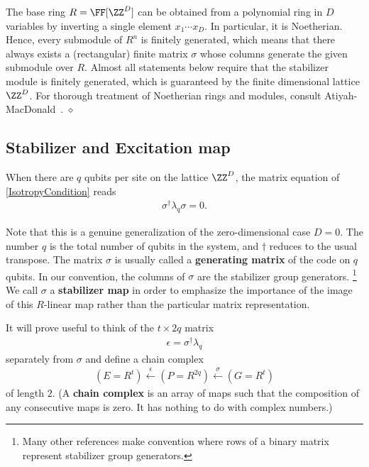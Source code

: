 \begin{rem}
The base ring $R = \FF[\ZZ^D]$ can be obtained from a polynomial ring in $D$ variables
by inverting a single element $x_1 \cdots x_D$.
In particular, it is Noetherian.
Hence, every submodule of $R^n$ is finitely generated,
which means that there always exists a (rectangular) finite matrix $\sigma$
whose columns generate the given submodule over $R$.
Almost all statements below require that the stabilizer module
is finitely generated,
which is guaranteed by the finite dimensional lattice $\ZZ^D$.
For thorough treatment of Noetherian rings and modules,
consult Atiyah-MacDonald~\cite{AtiyahMacDonald}.
\hfill $\diamond$ \end{rem}



\subsection{Stabilizer and Excitation map}

When there are $q$ qubits per site on the lattice $\ZZ^D$,
the matrix equation of \ref{IsotropyCondition} reads
\begin{align}
\sigma^\dagger \lambda_q \sigma = 0.
\end{align}

Note that this is a genuine generalization of the zero-dimensional case $D=0$.
The number $q$ is the total number of qubits in the system,
and $\dagger$ reduces to the usual transpose.
The matrix $\sigma$ is usually called a {\bf generating matrix} of the code on $q$ qubits.
In our convention, the columns of $\sigma$ are the stabilizer group generators.%
\footnote{
Many other references make convention where rows of a binary matrix represent
stabilizer group generators.
}
We call $\sigma$ a {\bf stabilizer map}
in order to emphasize the importance of the image of this $R$-linear map 
rather than the particular matrix representation.


It will prove useful to think of the $t \times 2q$ matrix 
\begin{align}
\epsilon = \sigma^\dagger \lambda_q
\end{align}
separately from $\sigma$ and define a chain complex
\begin{align}
(E = R^t) \xleftarrow{\epsilon} (P=R^{2q}) \xleftarrow{\sigma} (G = R^t)
\end{align}
of length $2$.
(A {\bf chain complex} is an array of maps such that the composition of any consecutive maps is zero.
It has nothing to do with complex numbers.)

